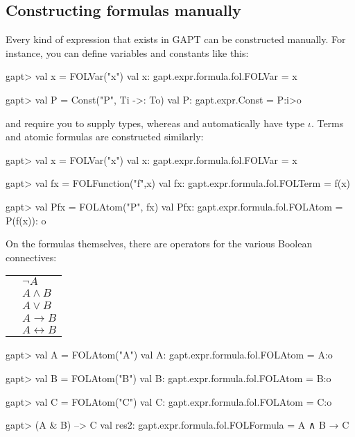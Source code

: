 \documentclass[a4paper,11pt]{book}
\newcommand{\impl}{\to} %
\newcommand{\cli}[1]{{\ttfamily {#1}}}
\begin{document}
\subsection{Constructing formulas manually}
Every kind of expression that exists in GAPT can be constructed manually. For instance, you can define variables
and constants like this:
\begin{clilisting}
  gapt> val x = FOLVar("x")
  val x: gapt.expr.formula.fol.FOLVar = x

  gapt> val P = Const("P", Ti ->: To)
  val P: gapt.expr.Const = P:i>o

\end{clilisting}
\cli{Var} and \cli{Const} require you to supply types, whereas \cli{FOLVar} and
\cli{FOLConst} automatically have type $\iota$. Terms and atomic formulas are constructed
similarly:
\begin{clilisting}
  gapt> val x = FOLVar("x")
  val x: gapt.expr.formula.fol.FOLVar = x

  gapt> val fx = FOLFunction("f",x)
  val fx: gapt.expr.formula.fol.FOLTerm = f(x)

  gapt> val Pfx = FOLAtom("P", fx)
  val Pfx: gapt.expr.formula.fol.FOLAtom = P(f(x)): o

\end{clilisting}

On the formulas themselves, there are operators for the various Boolean connectives:

\begin{tabular}{r l}
  \cli{-A}      & $\neg A$              \\
  \cli{A \& B}  & $A \wedge B$          \\
  \cli{A | B}   & $A \vee B$            \\
  \cli{A --> B} & $A \impl B$           \\
  \cli{A <-> B} & $A \leftrightarrow B$
\end{tabular}

\begin{clilisting}
  gapt> val A = FOLAtom("A")
  val A: gapt.expr.formula.fol.FOLAtom = A:o

  gapt> val B = FOLAtom("B")
  val B: gapt.expr.formula.fol.FOLAtom = B:o

  gapt> val C = FOLAtom("C")
  val C: gapt.expr.formula.fol.FOLAtom = C:o

  gapt> (A & B) --> C
  val res2: gapt.expr.formula.fol.FOLFormula = A ∧ B → C

\end{clilisting}
\end{document}
